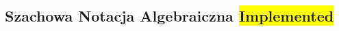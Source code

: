 \subsection{Szachowa Notacja Algebraiczna \colorbox{yellow}{Implemented}}
\label{subsec:notacja-algebraiczna}